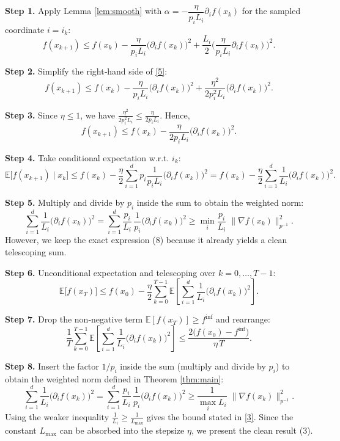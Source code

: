 \documentclass{article}
\newcommand{\E}{\mathbb{E}}
\begin{document}
\medskip
\noindent\textbf{Step 1.} Apply Lemma \ref{lem:smooth} with $\alpha = -\dfrac{\eta}{p_i L_i}\partial_i f(x_k)$ for the sampled coordinate $i=i_k$:
\[
f(x_{k+1})\le f(x_k)-\frac{\eta}{p_i L_i}\big(\partial_i f(x_k)\big)^{2}
+\frac{L_i}{2}\Big(\frac{\eta}{p_i L_i}\partial_i f(x_k)\Big)^{2}.
\tag{5}
\]

\noindent\textbf{Step 2.} Simplify the right‑hand side of \eqref{5}:
\[
f(x_{k+1})\le f(x_k)-\frac{\eta}{p_i L_i}\big(\partial_i f(x_k)\big)^{2}
+\frac{\eta^{2}}{2p_i^{2}L_i}\big(\partial_i f(x_k)\big)^{2}.
\tag{6}
\]

\noindent\textbf{Step 3.} Since $\eta\le 1$, we have $\frac{\eta^{2}}{2p_i^{2}L_i}\le\frac{\eta}{2p_i L_i}$. Hence,
\[
f(x_{k+1})\le f(x_k)-\frac{\eta}{2p_i L_i}\big(\partial_i f(x_k)\big)^{2}.
\tag{7}
\]

\noindent\textbf{Step 4.} Take conditional expectation w.r.t. $i_k$:
\[
\E\!\big[f(x_{k+1})\mid x_k\big]\le 
f(x_k)-\frac{\eta}{2}\sum_{i=1}^{d}p_i\frac{1}{p_i L_i}\big(\partial_i f(x_k)\big)^{2}
= f(x_k)-\frac{\eta}{2}\sum_{i=1}^{d}\frac{1}{L_i}\big(\partial_i f(x_k)\big)^{2}.
\tag{8}
\]

\noindent\textbf{Step 5.} Multiply and divide by $p_i$ inside the sum to obtain the weighted norm:
\[
\sum_{i=1}^{d}\frac{1}{L_i}\big(\partial_i f(x_k)\big)^{2}
= \sum_{i=1}^{d}\frac{p_i}{L_i}\,\frac{1}{p_i}\big(\partial_i f(x_k)\big)^{2}
\ge \min_{i}\frac{p_i}{L_i}\;\|\nabla f(x_k)\|_{p^{-1}}^{2}.
\tag{9}
\]
However, we keep the exact expression (8) because it already yields a clean telescoping sum.

\noindent\textbf{Step 6.} Unconditional expectation and telescoping over $k=0,\dots ,T-1$:
\[
\E\!\big[f(x_{T})\big]\le f(x_0)-\frac{\eta}{2}\sum_{k=0}^{T-1}
\E\!\left[\sum_{i=1}^{d}\frac{1}{L_i}\big(\partial_i f(x_k)\big)^{2}\right].
\tag{10}
\]

\noindent\textbf{Step 7.} Drop the non‑negative term $ \E[f(x_T)]\ge f^{\inf}$ and rearrange:
\[
\frac{1}{T}\sum_{k=0}^{T-1}
\E\!\left[\sum_{i=1}^{d}\frac{1}{L_i}\big(\partial_i f(x_k)\big)^{2}\right]
\le \frac{2\big(f(x_0)-f^{\inf}\big)}{\eta\,T}.
\tag{11}
\]

\noindent\textbf{Step 8.} Insert the factor $1/p_i$ inside the sum (multiply and divide by $p_i$) to obtain the weighted norm defined in Theorem \ref{thm:main}:
\[
\sum_{i=1}^{d}\frac{1}{L_i}\big(\partial_i f(x_k)\big)^{2}
=
\sum_{i=1}^{d}\frac{p_i}{L_i}\,\frac{1}{p_i}\big(\partial_i f(x_k)\big)^{2}
\ge \frac{1}{\max_i L_i}\;\|\nabla f(x_k)\|_{p^{-1}}^{2}.
\]
Using the weaker inequality $\frac{1}{L_i}\ge\frac{1}{L_{\max}}$ gives the bound stated in \eqref{3}.  
Since the constant $L_{\max}$ can be absorbed into the stepsize $\eta$, we present the clean result (3).
\end{document}
